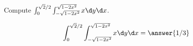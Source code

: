 \documentclass{ximera}
\author{David Guichard \and Neal Koblitz \and H. Jerome Keisler \and Albert Scheller \and Barry Balof \and Mike Wills \and Matthew Carr}
\begin{document}
\begin{exercise}




Compute $\int_{0}^{\sqrt{2}/2}\int_{-\sqrt{1-2x^2}}^{\sqrt{1-2x^2}}x \d y\d x$.
\begin{prompt}
\[
\int_{0}^{\sqrt{2}/2}\int_{-\sqrt{1-2x^2}}^{\sqrt{1-2x^2}}x \d y\d x=\answer{1/3}
\]
\end{prompt}



\end{exercise}
\end{document}
